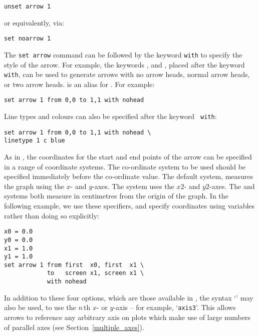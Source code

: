 \begin{verbatim}
unset arrow 1
\end{verbatim}

\noindent or equivalently, via:

\begin{verbatim}
set noarrow 1
\end{verbatim}

The {\tt set arrow} command can be followed by the keyword {\tt with} to
specify the style of the arrow. For example, the keywords ,
 and , placed after the keyword {\tt with}, can
be used to generate arrows with no arrow heads, normal arrow heads, or two
arrow heads.   is an alias for .  For example:

\begin{verbatim}
set arrow 1 from 0,0 to 1,1 with nohead
\end{verbatim}

\noindent Line types and colours can also be specified after the keyword {\tt
with}:

\begin{verbatim}
set arrow 1 from 0,0 to 1,1 with nohead \
linetype 1 c blue
\end{verbatim}

As in \gnuplot, the coordinates for the start and end points of the arrow can
be specified in a range of coordinate systems. The co-ordinate system to be
used should be specified immediately before the co-ordinate value. The default
system, \indcot{first} measures the graph using the $x$- and $y$-axes. The
\indcot{second} system uses the $x2$- and $y2$-axes. The \indcot{screen} and
\indcot{graph} systems both measure in centimetres from the origin of the
graph. In the following example, we use these specifiers, and specify
coordinates using variables rather than doing so explicitly:

\begin{verbatim}
x0 = 0.0
y0 = 0.0
x1 = 1.0
y1 = 1.0
set arrow 1 from first  x0, first  x1 \
            to   screen x1, screen x1 \
            with nohead
\end{verbatim}

In addition to these four options, which are those available in \gnuplot, the
syntax `' may also be used, to use the $n\,$th $x$- or
$y$-axis -- for example, `{\tt axis3}'. This allows arrows to
reference any arbitrary axis on plots which make use of large numbers of
parallel axes (see Section~\ref{multiple_axes}).

